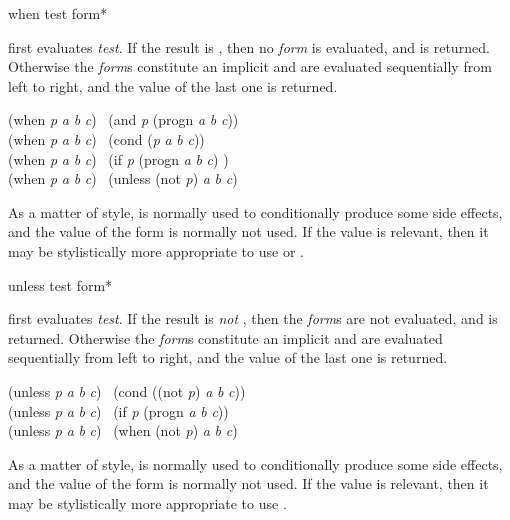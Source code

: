 \begin{defmac}
when test {form}*

first evaluates \emph{test}.  If the result is {\false},
then no \emph{form} is evaluated, and {\false} is returned.
Otherwise the \emph{form}s constitute an implicit 
and are evaluated sequentially from left to right,
and the value of the last one is returned.
\begin{lisp}
(when \emph{p} \emph{a} \emph{b} \emph{c}) \EQ\ (and \emph{p} (progn \emph{a} \emph{b} \emph{c})) \\
(when \emph{p} \emph{a} \emph{b} \emph{c}) \EQ\ (cond (\emph{p} \emph{a} \emph{b} \emph{c})) \\
(when \emph{p} \emph{a} \emph{b} \emph{c}) \EQ\ (if \emph{p} (progn \emph{a} \emph{b} \emph{c}) {\false}) \\
(when \emph{p} \emph{a} \emph{b} \emph{c}) \EQ\ (unless (not \emph{p}) \emph{a} \emph{b} \emph{c})
\end{lisp}
As a matter of style,
 is normally used to conditionally produce some side effects,
and the value of the  form is normally not used.
If the value is relevant, then it may be
stylistically more appropriate to use  or .
\end{defmac}

\begin{defmac}
unless test {form}*

first evaluates \emph{test}.  If the result is \emph{not} {\false},
then the \emph{form}s are not evaluated, and {\false} is returned.
Otherwise the \emph{form}s constitute an implicit 
and are evaluated sequentially from left to right,
and the value of the last one is returned.
\begin{lisp}
(unless \emph{p} \emph{a} \emph{b} \emph{c}) \EQ\ (cond ((not \emph{p}) \emph{a} \emph{b} \emph{c})) \\
(unless \emph{p} \emph{a} \emph{b} \emph{c}) \EQ\ (if \emph{p} {\false} (progn \emph{a} \emph{b} \emph{c})) \\
(unless \emph{p} \emph{a} \emph{b} \emph{c}) \EQ\ (when (not \emph{p}) \emph{a} \emph{b} \emph{c})
\end{lisp}
As a matter of style,
 is normally used to conditionally produce some side effects,
and the value of the  form is normally not used.
If the value is relevant, then it may be
stylistically more appropriate to use .
\end{defmac}

